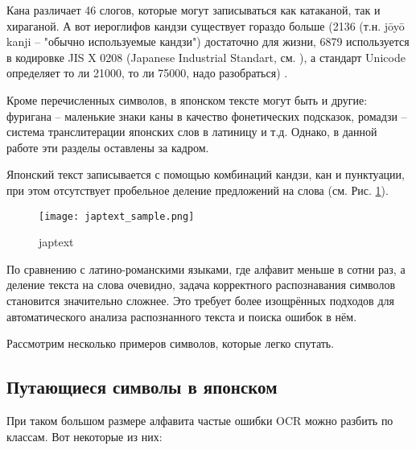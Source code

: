 Кана различает 46 слогов, которые могут записываться как катаканой, так и хираганой. А вот иероглифов кандзи существует гораздо больше (2136 (т.н. jōyō kanji -- "обычно используемые кандзи") достаточно для жизни, 6879 используется в кодировке JIS X 0208 (Japanese Industrial Standart, см. \cite{JISX0208}), а стандарт Unicode определяет то ли 21000, то ли 75000, надо разобраться) .

Кроме перечисленных символов, в японском тексте могут быть и другие: фуригана -- маленькие знаки каны в качество фонетических подсказок, ромадзи -- система транслитерации японских слов в латиницу и т.д. Однако, в данной работе эти разделы оставлены за кадром.

Японский текст записывается с помощью комбинаций кандзи, кан и пунктуации, при этом отсутствует пробельное деление предложений на слова (см. Рис. \cref{fig:japtext_sample}).
	\begin{figure}[H]
	\centering
	\texttt{[image: japtext\_sample.png]}
	\caption{japtext}
	\label{fig:japtext_sample}
\end{figure}

По сравнению с латино-романскими языками, где алфавит меньше в сотни раз, а деление текста на слова очевидно, задача корректного распознавания символов становится значительно сложнее. Это требует более изощрённых подходов для автоматического анализа распознанного текста и поиска ошибок в нём.

Рассмотрим несколько примеров символов, которые легко спутать.

\subsection{ Путающиеся символы в японском }

При таком большом размере алфавита частые ошибки OCR можно разбить по классам. Вот некоторые из них:

